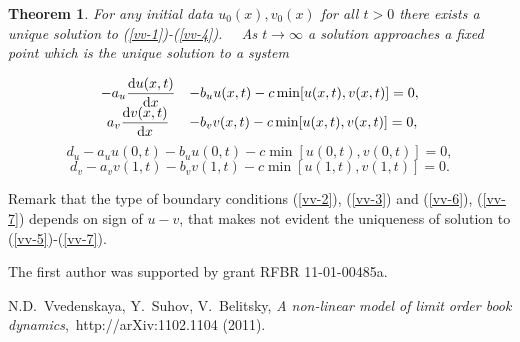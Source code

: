 \documentclass[10pt,a4paper]{article}
\newtheorem{theorem}{Theorem}
\begin{document}
\begin{theorem}\label{vv-thm1}
For any  initial data $u_0(x),v_0(x)$  for all $t>0$ there exists a
unique  solution  to (\rm{\ref{vv-1}})-(\rm{\ref{vv-4}}). \ \  As
$t\to\infty$ a solution approaches a fixed point which is the unique
solution to  a  system



\begin{equation}\label{vv-5}
\begin{array}{cl}
-a_u\displaystyle{\frac{{\rm d} u(x,t)}{{\rm d}
x}}&-b_uu(x,t)-c\min[u(x,t), v(x,t)]=0,
\\
a_v\displaystyle{\frac{{\rm d}v(x,t)}{{\rm d}
x}}&-b_vv(x,t)-c\min[u(x,t), v(x,t)]=0,
\end{array}
\end{equation}
\begin{equation}\label{vv-6}
d_u-a_uu(0,t)-b_uu(0,t)-c\min[u(0,t),v(0,t)]=0,
\end{equation}
\begin{equation}\label{vv-7}
d_v-a_vv(1,t)-b_vv(1,t)-c\min[u(1,t),v(1,t)]=0.
\end{equation}
\end{theorem}

Remark that the type of boundary conditions  (\ref{vv-2}), (\ref{vv-3})
and (\ref{vv-6}), (\ref{vv-7}) depends on  sign of $u-v$, that makes not
evident the uniqueness of solution to (\ref{vv-5})-(\ref{vv-7}).

\medskip

The first author was supported by grant RFBR 11-01-00485a.


\begin{thebibliography}{6}

 N.D.~Vvedenskaya, Y.~Suhov, V.~Belitsky, \emph{A non-linear model of
limit order book dynamics},\ http://arXiv:1102.1104 (2011).


\end{thebibliography}
\end{document}
